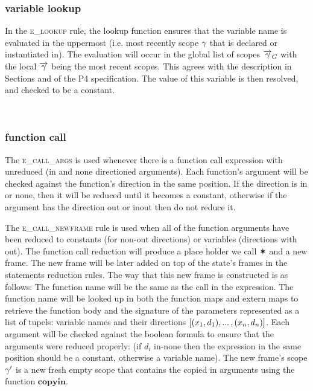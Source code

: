 \documentclass[UTF8]{article}
\begin{document}
\subsubsection*{variable lookup}
In the \textsc{e\_lookup} rule, the lookup function ensures that the variable name \vn{} is evaluated in the uppermost (i.e. most recently scope $\gamma$ that \vn{} is declared or instantiated in). The evaluation will occur in the global list of scopes $\overrightarrow{\gamma}_G$ with the local $\overrightarrow{\gamma}{}$ being the most recent scopes. This agrees with the description in Sections  and  of the P4 specification. The value of this variable is then resolved, and checked to be a constant.

\begin{figure}[ht!]
    \ottusedrule{\ottdruleeXXlookup{}} \\
\end{figure}



\subsubsection*{function call}
The \textsc{e\_call\_args} is used whenever there is a function call expression with unreduced (in and none directioned arguments). Each function's argument will be checked against the function's direction in the same position. If the direction is in or none, then it will be reduced until it becomes a constant, otherwise if the argument has the direction out or inout then do not reduce it.  


The \textsc{e\_call\_newframe} rule is used when all of the function arguments have been reduced to constants (for non-out directions) or variables (directions with out). The function call reduction will produce a place holder we call $\varstar$ and a new frame.  The new frame will be later added on top of the state's frames in the statements reduction rules. 
The way that this new frame is constructed is as follows: The function name \funn{} will be the same as the call in the expression. The function name \funn{} will be looked up in both the function maps and extern maps to retrieve the function body \stmt{}  and the signature of the parameters represented as a list of tupels: variable names and their directions $ [(x{}_1, d_1) , ... \, , (x{}_n, d_n) ] $. Each argument will be checked against the boolean formula to ensure that the arguments were reduced properly: (if $d_i$ in-none then the expression in the same position should be a constant, otherwise a variable name). The new frame's scope $\gamma'$ is a new fresh empty scope that contains the copied in arguments using the function $\mathbf{copyin}$.
\end{document}
